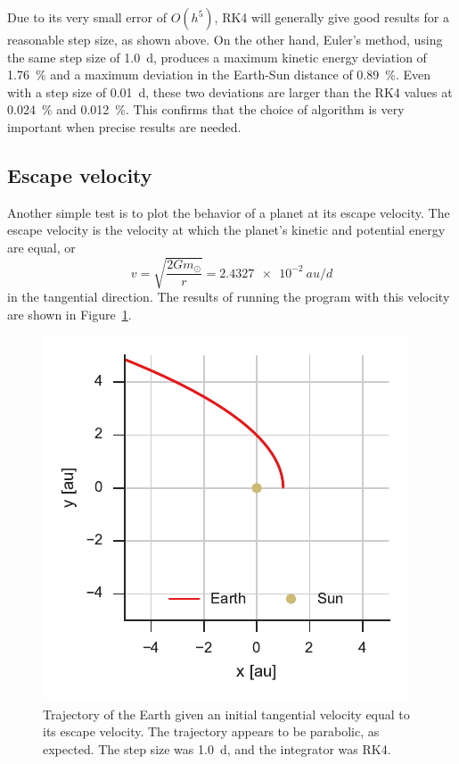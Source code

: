 \documentclass[aps,prc,reprint,nobalancelastpage]{revtex4-1}
\newcommand{\sun}[0]{\ensuremath{\odot}}
\begin{document}
        Due to its very small error of $O(h^5)$, RK4 will generally give good results for a reasonable step size, as shown above. On the other hand, Euler's method, using the same step size of \SI{1.0}{d}, produces a maximum kinetic energy deviation of \SI{1.76}{\percent} and a maximum deviation in the Earth-Sun distance of \SI{0.89}{\percent}. Even with a step size of \SI{0.01}{d}, these two deviations are larger than the RK4 values at \SI{0.024}{\percent} and \SI{0.012}{\percent}. This confirms that the choice of algorithm is very important when precise results are needed.

    \subsection{Escape velocity}
    \label{sub:escape}

        Another simple test is to plot the behavior of a planet at its escape velocity. The escape velocity is the velocity at which the planet's kinetic and potential energy are equal, or
        \begin{equation}
            v = \sqrt{\frac{2Gm_\sun}{r}} = \SI{2.4327e-2}{au/d}
        \end{equation}
        in the tangential direction. \cite{Goldstein2002} The results of running the program with this velocity are shown in Figure~\ref{fig:escape}.

        \begin{figure}
            \includegraphics{escape.pdf}
            \caption{Trajectory of the Earth given an initial tangential velocity equal to its escape velocity. The trajectory appears to be parabolic, as expected. \cite{Goldstein2002} The step size was \SI{1.0}{d}, and the integrator was RK4.}
            \label{fig:escape}
        \end{figure}
\end{document}
